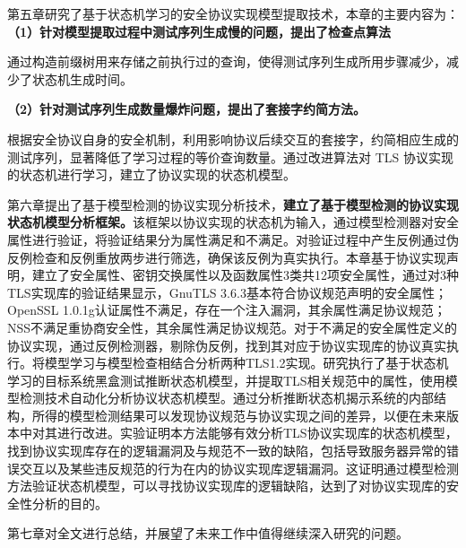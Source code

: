第五章研究了基于状态机学习的安全协议实现模型提取技术，本章的主要内容为：\textbf{（1）针对模型提取过程中测试序列生成慢的问题，提出了检查点算法}

通过构造前缀树用来存储之前执行过的查询，使得测试序列生成所用步骤减少，减少了状态机生成时间。

\textbf{（2）针对测试序列生成数量爆炸问题，提出了套接字约简方法。}

根据安全协议自身的安全机制，利用影响协议后续交互的套接字，约简相应生成的测试序列，显著降低了学习过程的等价查询数量。通过改进算法对 TLS 协议实现的状态机进行学习，建立了协议实现的状态机模型。

第六章提出了基于模型检测的协议实现分析技术，\textbf{建立了基于模型检测的协议实现状态机模型分析框架。}该框架以协议实现的状态机为输入，通过模型检测器对安全属性进行验证，将验证结果分为属性满足和不满足。对验证过程中产生反例通过伪反例检查和反例重放两步进行筛选，确保该反例为真实执行。本章基于协议实现声明，建立了安全属性、密钥交换属性以及函数属性3类共12项安全属性，通过对3种TLS实现库的验证结果显示，GnuTLS 3.6.3基本符合协议规范声明的安全属性；OpenSSL 1.0.1g认证属性不满足，存在一个注入漏洞，其余属性满足协议规范；NSS不满足重协商安全性，其余属性满足协议规范。对于不满足的安全属性定义的协议实现，通过反例检测器，剔除伪反例，找到其对应于协议实现库的协议真实执行。将模型学习与模型检查相结合分析两种TLS1.2实现。研究执行了基于状态机学习的目标系统黑盒测试推断状态机模型，并提取TLS相关规范中的属性，使用模型检测技术自动化分析协议状态机模型。通过分析推断状态机揭示系统的内部结构，所得的模型检测结果可以发现协议规范与协议实现之间的差异，以便在未来版本中对其进行改进。实验证明本方法能够有效分析TLS协议实现库的状态机模型，找到协议实现库存在的逻辑漏洞及与规范不一致的缺陷，包括导致服务器异常的错误交互以及某些违反规范的行为在内的协议实现库逻辑漏洞。这证明通过模型检测方法验证状态机模型，可以寻找协议实现库的逻辑缺陷，达到了对协议实现库的安全性分析的目的。

第七章对全文进行总结，并展望了未来工作中值得继续深入研究的问题。 
